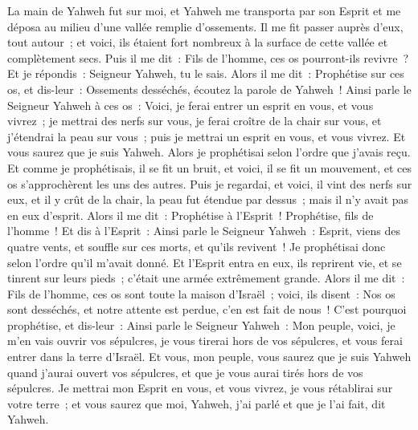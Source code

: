\begin{multicols}{2}
\VerseOne{}La main de Yahweh fut sur moi, et Yahweh me transporta par son Esprit et me déposa au milieu d'une vallée remplie d'ossements.
Il me fit passer auprès d'eux, tout autour~; et voici, ils étaient fort nombreux à la surface de cette vallée et complètement secs.
Puis il me dit~: Fils de l'homme, ces os pourront-ils revivre~? Et je répondis~: Seigneur Yahweh, tu le sais.
Alors il me dit~: Prophétise sur ces os, et dis-leur~: Ossements desséchés, écoutez la parole de Yahweh~!
Ainsi parle le Seigneur Yahweh à ces os~: Voici, je ferai entrer un esprit en vous, et vous vivrez~;
je mettrai des nerfs sur vous, je ferai croître de la chair sur vous, et j'étendrai la peau sur vous~; puis je mettrai un esprit en vous, et vous vivrez. Et vous saurez que je suis Yahweh.
Alors je prophétisai selon l'ordre que j'avais reçu. Et comme je prophétisais, il se fit un bruit, et voici, il se fit un mouvement, et ces os s'approchèrent les uns des autres.
Puis je regardai, et voici, il vint des nerfs sur eux, et il y crût de la chair, la peau fut étendue par dessus~; mais il n'y avait pas en eux d'esprit.
Alors il me dit~: Prophétise à l'Esprit~! Prophétise, fils de l'homme~! Et dis à l'Esprit~: Ainsi parle le Seigneur Yahweh~: Esprit, viens des quatre vents, et souffle sur ces morts, et qu'ils revivent~!
Je prophétisai donc selon l'ordre qu'il m'avait donné. Et l'Esprit entra en eux, ils reprirent vie, et se tinrent sur leurs pieds~; c'était une armée extrêmement grande.
Alors il me dit~: Fils de l'homme, ces os sont toute la maison d'Israël~; voici, ils disent~: Nos os sont desséchés, et notre attente est perdue, c'en est fait de nous~!
C'est pourquoi prophétise, et dis-leur~: Ainsi parle le Seigneur Yahweh~: Mon peuple, voici, je m'en vais ouvrir vos sépulcres, je vous tirerai hors de vos sépulcres, et vous ferai entrer dans la terre d'Israël.
Et vous, mon peuple, vous saurez que je suis Yahweh quand j'aurai ouvert vos sépulcres, et que je vous aurai tirés hors de vos sépulcres.
Je mettrai mon Esprit en vous, et vous vivrez, je vous rétablirai sur votre terre~; et vous saurez que moi, Yahweh, j'ai parlé et que je l'ai fait, dit Yahweh.

\end{multicols}

